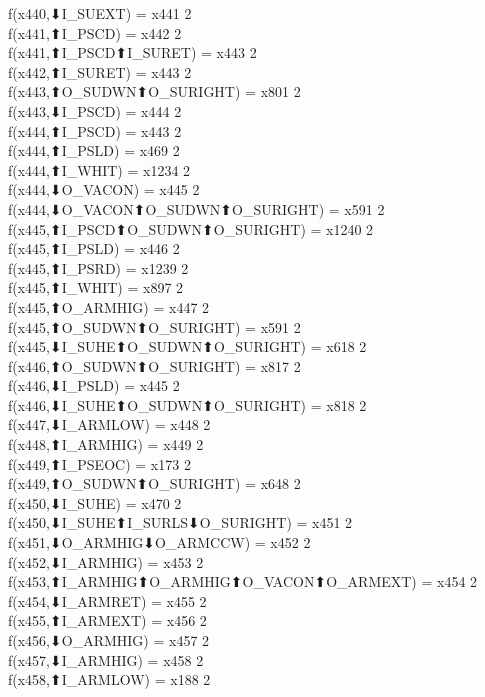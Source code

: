 f(x440,⬇I_SUEXT) = x441 {2} \\
f(x441,⬆I_PSCD) = x442 {2} \\
f(x441,⬆I_PSCD⬆I_SURET) = x443 {2} \\
f(x442,⬆I_SURET) = x443 {2} \\
f(x443,⬆O_SUDWN⬆O_SURIGHT) = x801 {2} \\
f(x443,⬇I_PSCD) = x444 {2} \\
f(x444,⬆I_PSCD) = x443 {2} \\
f(x444,⬆I_PSLD) = x469 {2} \\
f(x444,⬆I_WHIT) = x1234 {2} \\
f(x444,⬇O_VACON) = x445 {2} \\
f(x444,⬇O_VACON⬆O_SUDWN⬆O_SURIGHT) = x591 {2} \\
f(x445,⬆I_PSCD⬆O_SUDWN⬆O_SURIGHT) = x1240 {2} \\
f(x445,⬆I_PSLD) = x446 {2} \\
f(x445,⬆I_PSRD) = x1239 {2} \\
f(x445,⬆I_WHIT) = x897 {2} \\
f(x445,⬆O_ARMHIG) = x447 {2} \\
f(x445,⬆O_SUDWN⬆O_SURIGHT) = x591 {2} \\
f(x445,⬇I_SUHE⬆O_SUDWN⬆O_SURIGHT) = x618 {2} \\
f(x446,⬆O_SUDWN⬆O_SURIGHT) = x817 {2} \\
f(x446,⬇I_PSLD) = x445 {2} \\
f(x446,⬇I_SUHE⬆O_SUDWN⬆O_SURIGHT) = x818 {2} \\
f(x447,⬇I_ARMLOW) = x448 {2} \\
f(x448,⬆I_ARMHIG) = x449 {2} \\
f(x449,⬆I_PSEOC) = x173 {2} \\
f(x449,⬆O_SUDWN⬆O_SURIGHT) = x648 {2} \\
f(x450,⬇I_SUHE) = x470 {2} \\
f(x450,⬇I_SUHE⬆I_SURLS⬇O_SURIGHT) = x451 {2} \\
f(x451,⬇O_ARMHIG⬇O_ARMCCW) = x452 {2} \\
f(x452,⬇I_ARMHIG) = x453 {2} \\
f(x453,⬆I_ARMHIG⬆O_ARMHIG⬆O_VACON⬆O_ARMEXT) = x454 {2} \\
f(x454,⬇I_ARMRET) = x455 {2} \\
f(x455,⬆I_ARMEXT) = x456 {2} \\
f(x456,⬇O_ARMHIG) = x457 {2} \\
f(x457,⬇I_ARMHIG) = x458 {2} \\
f(x458,⬆I_ARMLOW) = x188 {2} \\
